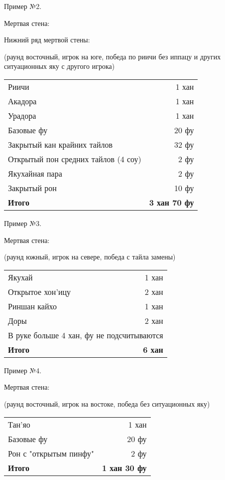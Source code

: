 Пример №2.

 \hfill {}

Мертвая стена: 

Нижний ряд мертвой стены: 

(раунд восточный, игрок на юге, победа по риичи без иппацу и других ситуационных яку с другого игрока)

\noindent\begin{tabular}{lr}
	Риичи & 1 хан \\
	Акадора & 1 хан \\
	Урадора & 1 хан \\
	Базовые фу & 20 фу \\
	Закрытый кан крайних тайлов & 32 фу \\
	Открытый пон средних тайлов (4 соу) & 2 фу \\
	Якухайная пара & 2 фу \\
	Закрытый рон & 10 фу \\
	\midrule
	\textbf{Итого} & \textbf{3 хан 70 фу} \\
\end{tabular}

Пример №3. 

 \hfill {}

Мертвая стена: 

(раунд южный, игрок на севере, победа с тайла замены)

\noindent\begin{tabular}{lr}
	Якухай & 1 хан \\
	Открытое хон'ицу & 2 хан \\
	Риншан кайхо & 1 хан \\
	Доры & 2 хан \\
	\multicolumn{2}{l}{В руке больше 4 хан, фу не подсчитываются} \\
	\midrule
	\textbf{Итого} & \textbf{6 хан} \\
\end{tabular}

Пример №4.

 \hfill {}

Мертвая стена: 

(раунд восточный, игрок на востоке, победа без ситуационных яку)

\noindent\begin{tabular}{lr}
	Тан'яо & 1 хан \\
	Базовые фу & 20 фу \\
	Рон с "открытым пинфу" & 2 фу \\
	\midrule
	\textbf{Итого} & \textbf{1 хан 30 фу} \\
\end{tabular}

